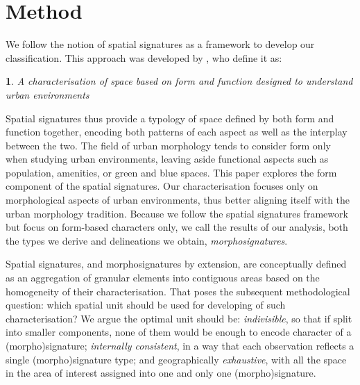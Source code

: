 \section{Method}
\label{sec:meth}

We follow the notion of spatial signatures as a framework
to develop our classification.
This approach was developed by \cite{dab_mf_2021}, who define it as:

\newtheorem*{theorem}{}
\begin{theorem}
    A characterisation of space based on form and function designed to understand urban
environments
\end{theorem}

Spatial signatures thus provide a typology of space defined by both form and function
together, encoding both patterns of each aspect as well as the interplay between the two. 
The field of urban morphology tends to consider form only when studying urban
environments, leaving aside functional aspects such as population, amenities,
or green and blue spaces. 
%
This paper explores the form component of the spatial signatures.
Our characterisation focuses only on morphological aspects of urban
environments, thus better aligning itself with the urban morphology tradition.
Because we follow the spatial signatures framework but focus on form-based
characters only, we call the results of our analysis, both the types we derive
and delineations we obtain, \textit{morphosignatures}.

Spatial signatures, and morphosignatures by extension, are conceptually defined as an aggregation of granular elements into
contiguous areas based on the homogeneity of their characterisation. That
poses the subsequent methodological question: which spatial unit should be
used for developing of such characterisation? We argue the optimal unit should
be: \textit{indivisible}, so that if split into
smaller components, none of them would be enough to encode character of a
(morpho)signature;
\textit{internally consistent}, in a way that each observation reflects a single (morpho)signature type;
and geographically \textit{exhaustive}, with all the space in the area of
interest assigned into one and only one (morpho)signature.

